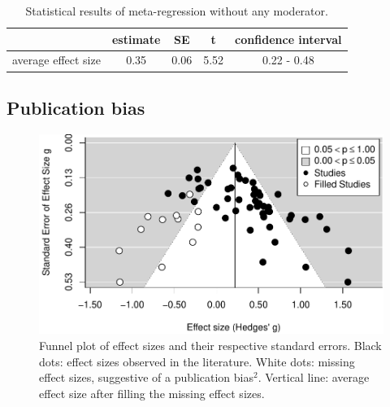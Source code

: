 \documentclass[
  english,
  man]{apa6}
\begin{document}
\begin{table}[tbp]

\begin{center}
\begin{threeparttable}

\caption{\label{tab:Table1}Statistical results of meta-regression without any moderator.}

\begin{tabular}{lcccc}
\toprule
 & estimate & SE & t & confidence interval\\
\midrule
average effect size & 0.35 & 0.06 & 5.52 & 0.22 - 0.48\\
\bottomrule
\end{tabular}

\end{threeparttable}
\end{center}

\end{table}

\hypertarget{publication-bias}{%
\subsection{Publication bias}\label{publication-bias}}

\begin{figure}
\centering
\includegraphics{MA_speech_pref_files/figure-latex/bias-1.pdf}
\caption{\label{fig:bias}Funnel plot of effect sizes and their respective standard errors. Black dots: effect sizes observed in the literature. White dots: missing effect sizes, suggestive of a publication bias\(^2\). Vertical line: average effect size after filling the missing effect sizes.}
\end{figure}
\end{document}
